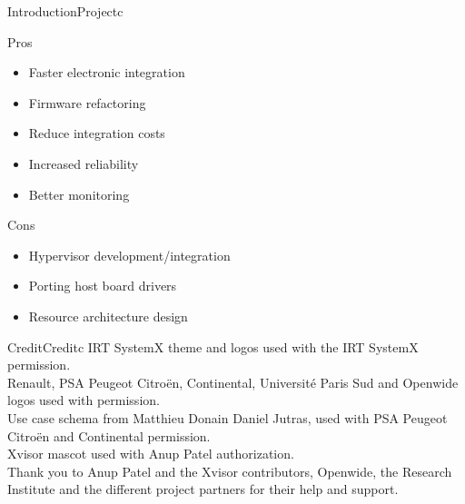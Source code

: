 \documentclass[english,slidetop,9pt,aspectratio=169]{beamer}
\begin{document}
  \begin{myframe}{Introduction}{Project}{c}
    \begin{minipage}{0.4\textwidth}
      \begin{nbox}{Pros}
        \begin{itemize}
        \item Faster electronic integration
        \item Firmware refactoring
        \item Reduce integration costs
        \item Increased reliability
        \item Better monitoring
        \end{itemize}
      \end{nbox}
      \begin{nbox}{Cons}
        \begin{itemize}
        \item Hypervisor development/integration
        \item Porting host board drivers
        \item Resource architecture design
        \end{itemize}
      \end{nbox}
    \end{minipage}
  \end{myframe}

  \begin{myframe}[0]{Credit}{Credit}{c}
    IRT SystemX theme and logos used with the IRT SystemX permission.\\
    Renault, PSA Peugeot Citro\"{e}n, Continental, Universit\'{e} Paris Sud
    and Openwide logos used with permission.\\
    Use case schema from Matthieu Donain Daniel Jutras, used with
    PSA Peugeot Citro\"{e}n and Continental permission.\\
    Xvisor mascot used with Anup Patel authorization.\\
    Thank you to Anup Patel and the Xvisor contributors, Openwide, the Research
    Institute and the different project partners for their help and support.
  \end{myframe}
\end{document}
